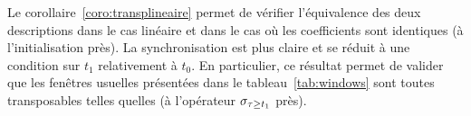 Le corollaire~\ref{coro:transplineaire} permet de vérifier l'équivalence des deux descriptions dans le cas linéaire et dans le cas où les coefficients sont identiques (à l'initialisation près). 
La synchronisation est plus claire et se réduit à une condition sur $t_1$ relativement à $t_0$. En particulier, ce résultat permet de valider que les fenêtres usuelles présentées dans le tableau~\ref{tab:windows} sont toutes transposables telles quelles (à l'opérateur $\sigma_{\tau\geq t_1}$ près).
